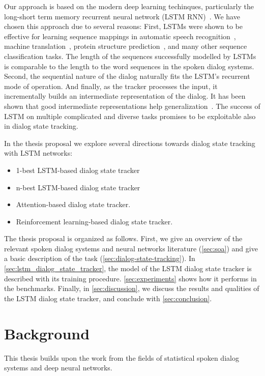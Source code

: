 \documentclass[10pt,twocolumn]{article}
\begin{document}
Our approach is based on the modern deep learning techinques, particularly the long-short term memory recurrent neural network (LSTM RNN)~\cite{hochreiter1997long}.
We have chosen this approach due to several reasons:
First, LSTMs were shown to be effective for learning sequence mappings in automatic speech recognition~\cite{graves2005framewise}, machine translation~\cite{sutskever2014sequence}, protein structure prediction~\cite{sonderby2014protein}, and many other sequence classification tasks. The length of the sequences successfully modelled by LSTMs is comparable to the length to the word sequences in the spoken dialog systems.
Second, the sequential nature of the dialog naturally fits the LSTM's recurrent mode of operation. And finally, as the tracker processes the input, it incrementally builds an intermediate representation of the dialog. It has been shown that good intermediate representations help generalization~\cite{gulccehre2013knowledge}.
The success of LSTM on multiple complicated and diverse tasks promises to be exploitable also in dialog state tracking.

In the thesis proposal we explore several directions towards dialog state tracking with LSTM networks:
\begin{itemize}
  \item 1-best LSTM-based dialog state tracker
  \item n-best LSTM-based dialog state tracker
  \item Attention-based dialog state tracker.
  \item Reinforcement learning-based dialog state tracker.
\end{itemize}

The thesis proposal is organized as follows. First, we give an overview of the relevant spoken dialog systems and neural networks literature (\autoref{sec:soa}) and give a basic description of the task (\autoref{sec:dialog-state-tracking}). In \autoref{sec:lstm_dialog_state_tracker}, the model of the LSTM dialog state tracker is described with its training procedure. \autoref{sec:experiments} shows how it performs in the benchmarks. Finally, in \autoref{sec:discussion}, we discuss the results and qualities of the LSTM dialog state tracker, and conclude with \autoref{sec:conclusion}.


\section{Background}
This thesis builds upon the work from the fields of statistical spoken dialog systems and deep neural networks.
\end{document}
